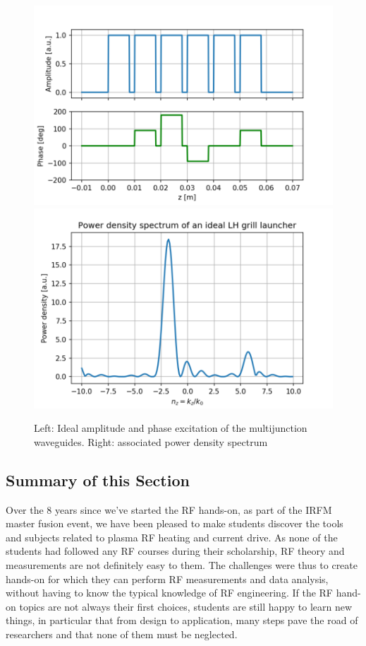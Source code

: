 \begin{figure}
	\centering
	\includegraphics[width=0.49\linewidth]{figures/chap5/handson_LH_MJ_3}
	\includegraphics[width=0.49\linewidth]{figures/chap5/handson_LH_MJ_4}
	\caption{Left: Ideal amplitude and phase excitation of the multijunction waveguides. Right: associated power density spectrum}
	\label{fig:handsonlhmj3}
\end{figure}

\subsection{Summary of this Section}
Over the 8 years since we’ve started the RF hands-on, as part of the IRFM master fusion event, we have been pleased to make students discover the tools and subjects related to plasma RF heating and current drive. As none of the students had followed any RF courses during their scholarship, RF theory and measurements are not definitely easy to them. The challenges were thus to create hands-on for which they can perform RF measurements and data analysis, without having to know the typical knowledge of RF engineering. If the RF hand-on topics are not always their first choices, students are still happy to learn new things, in particular that from design to application, many steps pave the road of researchers and that none of them must be neglected. 


